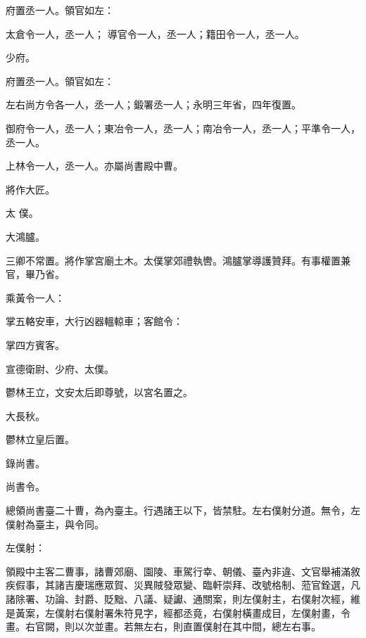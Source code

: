 \begin{pinyinscope}
 府置丞一人。領官如左：



 太倉令一人，丞一人；
 導官令一人，丞一人；籍田令一人，丞一人。



 少府。



 府置丞一人。領官如左：



 左右尚方令各一人，丞一人；鍛署丞一人；永明三年省，四年復置。



 御府令一人，丞一人；東冶令一人，丞一人；南冶令一人，丞一人；平準令一人，丞一人。



 上林令一人，丞一人。亦屬尚書殿中曹。



 將作大匠。



 太
 僕。



 大鴻臚。



 三卿不常置。將作掌宮廟土木。太僕掌郊禮執轡。鴻臚掌導護贊拜。有事權置兼官，畢乃省。



 乘黃令一人：



 掌五輅安車，大行凶器轀輬車；客館令：



 掌四方賓客。



 宣德衛尉、少府、太僕。



 鬱林王立，文安太后即尊號，以宮名置之。



 大長秋。



 鬱林立皇后置。



 錄尚書。



 尚書令。



 總領尚書臺二十曹，為內臺主。行遇諸王以下，皆禁駐。左右僕射分道。無令，左僕射為臺主，與令同。



 左僕射：



 領殿中主客二曹事，諸曹郊廟、園陵、車駕行幸、朝儀、臺內非違、文官舉補滿敘疾假事，其諸吉慶瑞應眾賀、災異賊發眾變、臨軒崇拜、改號格制、蒞官銓選，凡諸除署、功論、封爵、貶黜、八議、疑讞、通關案，則左僕射主，右僕射次經，維是黃案，左僕射右僕射署朱符見字，經都丞竟，右僕射橫畫成目，左僕射畫，令畫。右官闕，則以次並畫。若無左右，則直置僕射在其中間，總左右事。




\end{pinyinscope}
